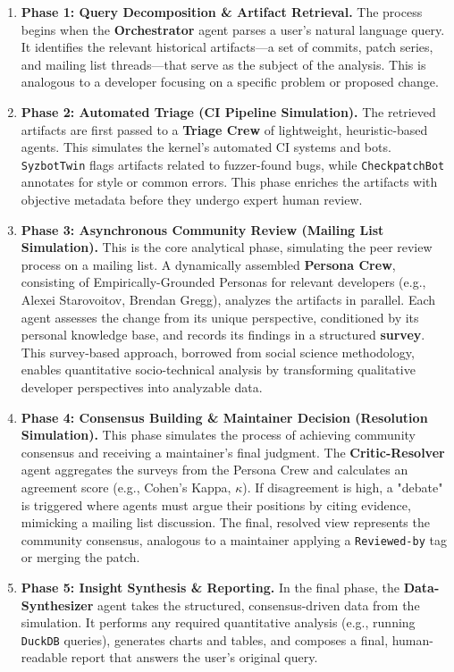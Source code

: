 \begin{enumerate}
\item \textbf{Phase 1: Query Decomposition \& Artifact Retrieval.} The process begins when the \textbf{Orchestrator} agent parses a user's natural language query. It identifies the relevant historical artifacts—a set of commits, patch series, and mailing list threads—that serve as the subject of the analysis. This is analogous to a developer focusing on a specific problem or proposed change.

\item \textbf{Phase 2: Automated Triage (CI Pipeline Simulation).} The retrieved artifacts are first passed to a \textbf{Triage Crew} of lightweight, heuristic-based agents. This simulates the kernel's automated CI systems and bots. \texttt{SyzbotTwin} flags artifacts related to fuzzer-found bugs, while \texttt{CheckpatchBot} annotates for style or common errors. This phase enriches the artifacts with objective metadata before they undergo expert human review.

\item \textbf{Phase 3: Asynchronous Community Review (Mailing List Simulation).} This is the core analytical phase, simulating the peer review process on a mailing list. A dynamically assembled \textbf{Persona Crew}, consisting of Empirically-Grounded Personas for relevant developers (e.g., Alexei Starovoitov, Brendan Gregg), analyzes the artifacts in parallel. Each agent assesses the change from its unique perspective, conditioned by its personal knowledge base, and records its findings in a structured \textbf{survey}. This survey-based approach, borrowed from social science methodology, enables quantitative socio-technical analysis by transforming qualitative developer perspectives into analyzable data.

\item \textbf{Phase 4: Consensus Building \& Maintainer Decision (Resolution Simulation).} This phase simulates the process of achieving community consensus and receiving a maintainer's final judgment. The \textbf{Critic-Resolver} agent aggregates the surveys from the Persona Crew and calculates an agreement score (e.g., Cohen's Kappa, $\kappa$). If disagreement is high, a "debate" is triggered where agents must argue their positions by citing evidence, mimicking a mailing list discussion. The final, resolved view represents the community consensus, analogous to a maintainer applying a \texttt{Reviewed-by} tag or merging the patch.

\item \textbf{Phase 5: Insight Synthesis \& Reporting.} In the final phase, the \textbf{Data-Synthesizer} agent takes the structured, consensus-driven data from the simulation. It performs any required quantitative analysis (e.g., running \texttt{DuckDB} queries), generates charts and tables, and composes a final, human-readable report that answers the user's original query.
\end{enumerate}


